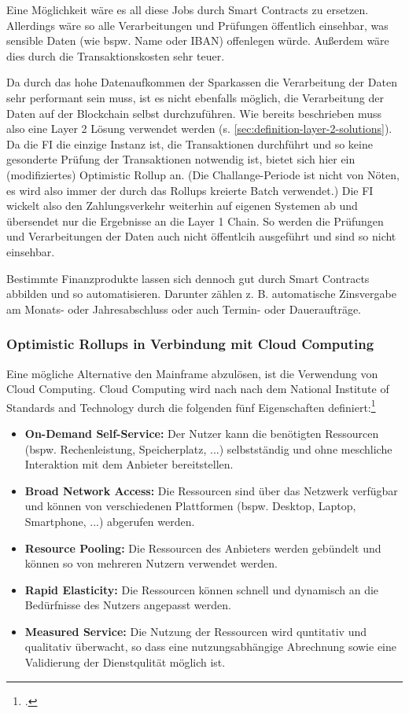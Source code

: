 \documentclass[12pt, a4paper]{article}
\begin{document}
{\noindent
Eine Möglichkeit wäre es all diese Jobs durch Smart Contracts zu ersetzen.
Allerdings wäre so alle Verarbeitungen und Prüfungen öffentlich einsehbar, was sensible Daten (wie bspw. Name oder IBAN) offenlegen würde.
Außerdem wäre dies durch die Transaktionskosten sehr teuer.

\noindent
Da durch das hohe Datenaufkommen der Sparkassen die Verarbeitung der Daten sehr performant sein muss, ist es nicht ebenfalls möglich, die Verarbeitung der Daten auf der Blockchain selbst durchzuführen.
Wie bereits beschrieben muss also eine Layer 2 Lösung verwendet werden (s. \ref{sec:definition-layer-2-solutions}).
Da die FI die einzige Instanz ist, die Transaktionen durchführt und so keine gesonderte Prüfung der Transaktionen notwendig ist, bietet sich hier ein (modifiziertes) Optimistic Rollup an. 
(Die Challange-Periode ist nicht von Nöten, es wird also immer der durch das Rollups kreierte Batch verwendet.)
Die FI wickelt also den Zahlungsverkehr weiterhin auf eigenen Systemen ab und übersendet nur die Ergebnisse an die Layer 1 Chain.
So werden die Prüfungen und Verarbeitungen der Daten auch nicht öffentlcih ausgeführt und sind so nicht einsehbar.

\noindent
Bestimmte Finanzprodukte lassen sich dennoch gut durch Smart Contracts abbilden und so automatisieren.
Darunter zählen z. B. automatische Zinsvergabe am Monats- oder Jahresabschluss oder auch Termin- oder Daueraufträge.

\subsubsection{Optimistic Rollups in Verbindung mit Cloud Computing}
Eine mögliche Alternative den Mainframe abzulösen, ist die Verwendung von Cloud Computing.
Cloud Computing wird nach nach dem National Institute of Standards and Technology durch die folgenden fünf Eigenschaften definiert:\footcite[Vgl. hierzu und zum Folgenden][5]{q11}
\begin{itemize}
    \item \textbf{On-Demand Self-Service:} 
    Der Nutzer kann die benötigten Ressourcen (bspw. Rechenleistung, Speicherplatz, ...) selbstständig und ohne meschliche Interaktion mit dem Anbieter bereitstellen.
    \item \textbf{Broad Network Access:}
    Die Ressourcen sind über das Netzwerk verfügbar und können von verschiedenen Plattformen (bspw. Desktop, Laptop, Smartphone, ...) abgerufen werden.
    \item \textbf{Resource Pooling:}
    Die Ressourcen des Anbieters werden gebündelt und können so von mehreren Nutzern verwendet werden.
    \item \textbf{Rapid Elasticity:}
    Die Ressourcen können schnell und dynamisch an die Bedürfnisse des Nutzers angepasst werden.
    \item \textbf{Measured Service:}
    Die Nutzung der Ressourcen wird quntitativ und qualitativ überwacht, so dass eine nutzungsabhängige Abrechnung sowie eine Validierung der Dienstqulität möglich ist.
\end{itemize}

}
\end{document}

